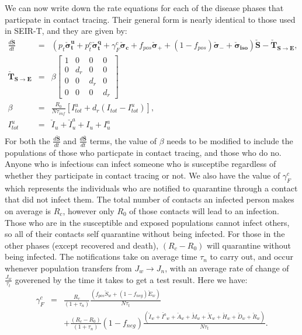 \documentclass[notitlepage, superscriptaddress]{revtex4-2}
\begin{document}
We can now write down the rate equations for each of the disease phases that particpate in contact tracing. Their general form is nearly identical to those used in SEIR-T, and they are given by:
\begin{eqnarray}
\frac{d \boldsymbol{\check{S}}}{dt} &=& \left( p_{t} \boldsymbol{\check{\sigma}^{u}_{t}} + p^{c}_{t} \boldsymbol{\check{\sigma}^{q}_{t}} + \gamma^{c}_{F} \boldsymbol{\check{\sigma}_{c}} + f_{pos} \boldsymbol{\check{\sigma}_{+}} + (1-f_{pos}) \boldsymbol{\check{\sigma}_{-}} + \boldsymbol{\check{\sigma}_{iso}} \right) \boldsymbol{\check{S}} - \boldsymbol{\check{T}_{S \rightarrow E}}, \\
%
\boldsymbol{\check{T}_{S \rightarrow E}} &=& \beta
    \begin{bmatrix}
    1 & 0 & 0 & 0 \\ 
    0 & d_{r} & 0 & 0 \\
    0 & 0 & d_{r} & 0 \\
    0 & 0 & 0 & d_{r}
    \end{bmatrix} \\ 
%
\beta &=& \frac{R_{0}}{N\tau_{inf}} \left[ {I^{u}_{tot}} + d_{r} (I_{tot} - {I^{u}_{tot}}) \right], \\%
{I^{u}_{tot}} &=& {\check{I}_{u}} + {\check{I}^{a}_{u}}+ {{I}_{u}} + {{I}^{a}_{u}} \\ 
\end{eqnarray}
For both the $\frac{d \boldsymbol{\check{S}}}{dt}$ and $\frac{d \boldsymbol{\bar{S}}}{dt}$ terms, the value of $\beta$ needs to be modified to include the populations of those who particpate in contact tracing, and those who do no. Anyone who is infectious can infect someone who is susceptibe regardless of whether they participate in contact tracing or not. We also have the value of $\gamma^{c}_{F}$ which represents the individuals who are notified to quarantine through a contact that did not infect them. The total number of contacts an infected person makes on average is $R_{c}$, however only $R_{0}$ of those contacts will lead to an infection. Those who are in the susceptible and exposed populations cannot infect others, so all of their contacts self quarantine without being infected. For those in the other phases (except recovered and death), $(R_{c} - R_{0})$ will quarantine without being infected. The notifications take on average time $\tau_{n}$ to carry out, and occur whenever population transfers from $J_{w} \rightarrow J_{n}$, with an average rate of change of $\frac{J_{w}}{\tau_{t}}$ goverened by the time it takes to get a test result. Here we have:
\begin{eqnarray}
\gamma^{c}_{F} &=& \frac{R_{c}}{(1+\tau_{n})}\frac{(f_{pos} \check{S}_{w} + (1-f_{neg})\check{E}_{w})}{N \tau_{t}} \nonumber \\ 
&& + \frac{(R_{c} - R_{0})}{(1+\tau_{n})} (1-f_{neg}) \frac{(\check{I}_{w} + \check{I^{a}}_{w} + \check{A}_{w} + \check{M}_{w} + \check{X}_{w} + \check{H}_{w} + \check{D}_{w} + \check{R}_{w} )}{N \tau_{t}}.
\end{eqnarray} 
\end{document}
